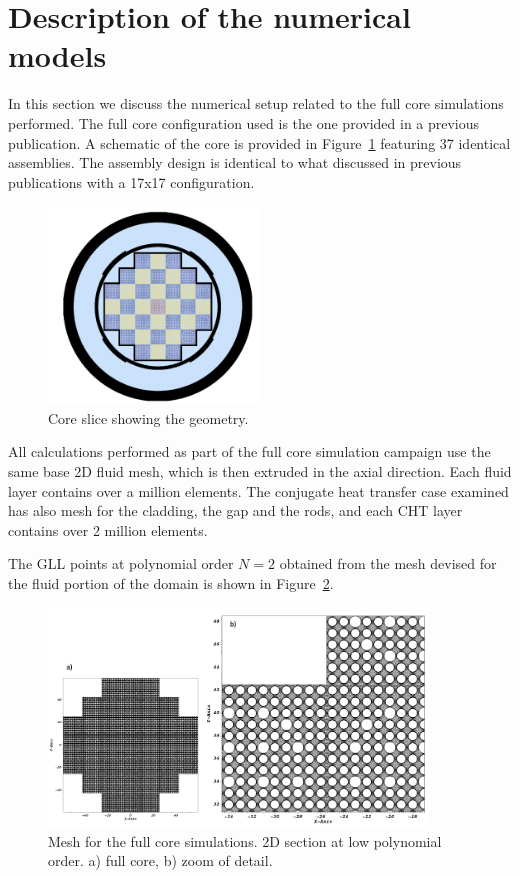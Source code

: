 \section{Description of the numerical models}
\label{sec:model}

In this section we discuss the numerical setup related to the full core simulations performed.
The full core configuration used is the one provided in a previous publication. A schematic of the core is provided in Figure~\ref{fig:core} featuring 37 identical assemblies. The assembly design is identical to what discussed in previous publications with a 17x17 configuration.

\begin{figure}[!ht]
\centering
\includegraphics[width=0.5\textwidth]{./figures/core_slice.png}
\caption{Core slice showing the geometry.}
\label{fig:core}
\end{figure}

All calculations performed as part of the full core simulation campaign use the same base 2D fluid mesh, which is then extruded in the axial direction. Each fluid layer contains over a million elements. The conjugate heat transfer case examined has also mesh for the cladding, the gap and the rods, and each CHT layer contains over 2 million elements.

The GLL points at polynomial order $N=2$ obtained from the mesh devised for the fluid portion of the domain is shown in Figure~\ref{fig:mesh1}.

\begin{figure}[!ht]
\centering
\includegraphics[width=0.9\textwidth]{./figures/full_core_mesh.png}
\caption{Mesh for the full core simulations. 2D section at low polynomial order. a) full core, b) zoom of detail.}
\label{fig:mesh1}
\end{figure}
